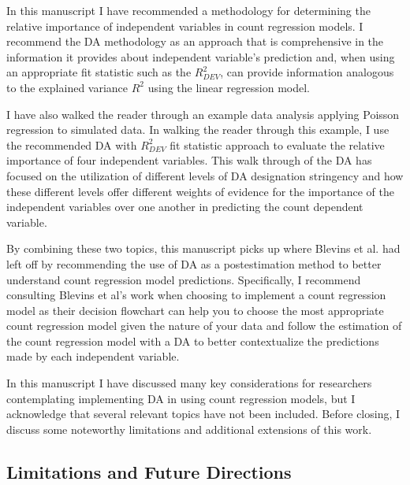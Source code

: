 \documentclass[man]{apa7}
\begin{document}
	In this manuscript I have recommended a methodology for determining the relative importance of independent variables in count regression models.
	I recommend the DA methodology as an approach that is comprehensive in the information it provides about independent variable's prediction and, when using an appropriate fit statistic such as the $R^2_{DEV}$, can provide information analogous to the explained variance $R^2$ using the linear regression model.
	
	I have also walked the reader through an example data analysis applying Poisson regression to simulated data. 
	In walking the reader through this example, I use the recommended DA with $R^2_{DEV}$ fit statistic approach to evaluate the relative importance of four independent variables.
	This walk through of the DA has focused on the utilization of different levels of DA designation stringency and how these different levels offer different weights of evidence for the importance of the independent variables over one another in predicting the count dependent variable.
	
	By combining these two topics, this manuscript picks up where Blevins et al. \parencite*{blevins2015count} had left off by recommending the use of DA as a postestimation method to better understand count regression model predictions.
	Specifically, I recommend consulting Blevins et al's work when choosing to implement a count regression model as their decision flowchart can help you to choose the most appropriate count regression model given the nature of your data and follow the estimation of the count regression model with a DA to better contextualize the predictions made by each independent variable.
	
	In this manuscript I have discussed many key considerations for researchers contemplating implementing DA in using count regression models, but I acknowledge that several relevant topics have not been included.
	Before closing, I discuss some noteworthy limitations and additional extensions of this work.
	
	\subsection{Limitations and Future Directions}
	
\end{document}

